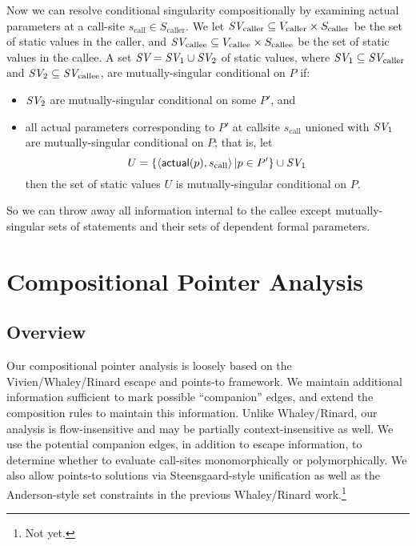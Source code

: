 \documentclass[11pt,notitlepage]{article}
\newcommand{\bigvar}[1]{\ensuremath{\text{\it #1}}}
\newcommand{\func}[1]{\ensuremath{\text{\sffamily #1}}}
\begin{document}
Now we can resolve conditional singularity compositionally by
examining actual parameters at a call-site $s_\text{call}\in S_\text{caller}$.
We let 
$\bigvar{SV}_\text{caller} \subseteq 
  V_\text{caller} \times S_\text{caller}$
be the set of static values in the caller, and
$\bigvar{SV}_\text{callee} \subseteq 
  V_\text{callee} \times S_\text{callee}$
be the set of static values in the callee.
A set $\bigvar{SV}=\bigvar{SV}_1 \cup \bigvar{SV}_2$ of static values,
where $\bigvar{SV}_1\subseteq \bigvar{SV}_\text{caller}$ and
      $\bigvar{SV}_2\subseteq \bigvar{SV}_\text{callee}$,
are mutually-singular conditional on $P$ if:
\begin{itemize}
\item $\bigvar{SV}_2$ are mutually-singular conditional on some $P'$,
and
\item all actual parameters corresponding to $P'$ at callsite $s_\text{call}$
  unioned with $\bigvar{SV}_1$ are mutually-singular conditional on $P$;
  that is, let
\begin{displaymath}
U = 
\left\{\tuple{\func{actual}(p), s_\text{call}} | p \in P' \right\}
    \cup
\bigvar{SV}_1
\end{displaymath}
then the set of static values $U$ is mutually-singular conditional on $P$.
\end{itemize}

So we can throw away all information internal to the callee except
mutually-singular sets of statements and their sets of dependent
formal parameters.


\section{Compositional Pointer Analysis}

\subsection{Overview}
Our compositional pointer analysis is loosely based on the Vivien/Whaley/Rinard
escape and points-to framework.  We maintain additional
information sufficient to mark possible ``companion'' edges, and
extend the composition rules to maintain this information.
Unlike Whaley/Rinard, our analysis is flow-insensitive
and may be partially context-insensitive as well.  
We use the potential companion edges, in addition to escape information,
to determine whether to evaluate call-sites monomorphically or
polymorphically.
We also allow points-to solutions via Steensgaard-style unification as well as
the Anderson-style set constraints in the previous Whaley/Rinard
work.\footnote{Not yet.}
\end{document}

